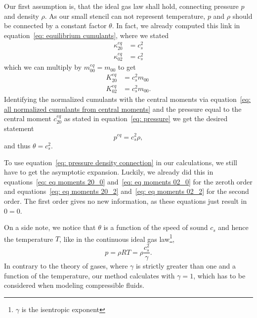 Our first assumption is, that the ideal gas law shall hold, connecting pressure $p$ and density $\rho$.
As our small stencil can not represent temperature, $p$ and $\rho$ should be connected by a constant factor $\theta$.
In fact, we already computed this link in equation~\eqref{eq: equilibrium cumulants}, where we stated
\begin{equation}
  \begin{aligned}
    \kappa_{20}^{eq} & = c_s^2  \\
    \kappa_{02}^{eq} & = c_s^2
  \end{aligned}
\end{equation}
which we can multiply by $m_{00}^{eq} = m_{00}$ to get
\begin{equation}
\label{eq: pressure density connection}
  \begin{aligned}
    K_{20}^{eq} & = c_s^2 m_{00}  \\
    K_{02}^{eq} & = c_s^2 m_{00}.
  \end{aligned}
\end{equation}
Identifying the normalized cumulants with the central moments via equation~\eqref{eq: all normalized cumulants from central moments} and the pressure equal to the central moment $c_{20}^{eq}$ as stated in equation~\eqref{eq: pressure} we get the desired statement
\begin{equation}
\label{eq: pressure density connection quantities}
  p^{eq}  = c_s^2 \rho,
\end{equation}
and thus $\theta=c_s^2$.

To use equation~\eqref{eq: pressure density connection} in our calculations, we still have to get the asymptotic expansion.
Luckily, we already did this in equations~\eqref{eq: eq moments 20_0} and~\eqref{eq: eq moments 02_0} for the zeroth order and equations~\eqref{eq: eq moments 20_2} and~\eqref{eq: eq moments 02_2} for the second order.
The first order gives no new information, as these equations just result in $0=0$.

On a side note, we notice that $\theta$ is a function of the speed of sound $c_s$ and hence the temperature $T$, like in the continuous ideal gas law\footnote{$\gamma$ is the isentropic exponent },
\begin{equation}
  p=\rho RT = \rho \frac{c_s^2}{\gamma}.
\end{equation}
In contrary to the theory of gases, where $\gamma$ is strictly greater than one and a function of the temperature, our method calculates with $\gamma=1$, which has to be considered when modeling compressible fluids.
